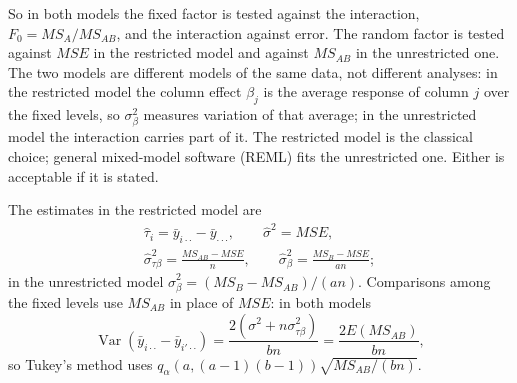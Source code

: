\documentclass[11pt,a4paper]{article}
\numberwithin{equation}{section}
\DeclareMathOperator{\Var}{Var}
\theoremstyle{definition}
\begin{document}
So in both models the fixed factor is tested against the interaction, $F_0 = MS_A/MS_{AB}$, and the interaction against error. The random factor is tested
against $MSE$ in the restricted model and against $MS_{AB}$ in the unrestricted one. The two models are different models of the same data, not different
analyses: in the restricted model the column effect $\beta_j$ is the average response of column $j$ over the fixed levels, so $\sigma^2_\beta$ measures variation of that
average; in the unrestricted model the interaction carries part of it. The restricted model is the classical choice; general mixed-model software
(REML) fits the unrestricted one. Either is acceptable if it is stated.

The estimates in the restricted model are
\begin{gather*}
\hat\tau_i = \bar y_{i\cdot\cdot} - \bar y_{\cdot\cdot\cdot} , \qquad \hat\sigma^2 = MSE , \\
\hat\sigma^2_{\tau\beta} = \frac{MS_{AB} - MSE}n , \qquad \hat\sigma^2_\beta = \frac{MS_B - MSE}{an} ;
\end{gather*}
in the unrestricted model $\hat\sigma^2_\beta = (MS_B - MS_{AB})/(an)$. Comparisons among the fixed levels use $MS_{AB}$ in place of $MSE$: in both models
\[
\Var(\bar y_{i\cdot\cdot} - \bar y_{i'\cdot\cdot}) = \frac{2(\sigma^2 + n\sigma^2_{\tau\beta})}{bn} = \frac{2E(MS_{AB})}{bn} ,
\]
so Tukey's method uses $q_\alpha(a, (a - 1)(b - 1))\sqrt{MS_{AB}/(bn)}$.
\end{document}
